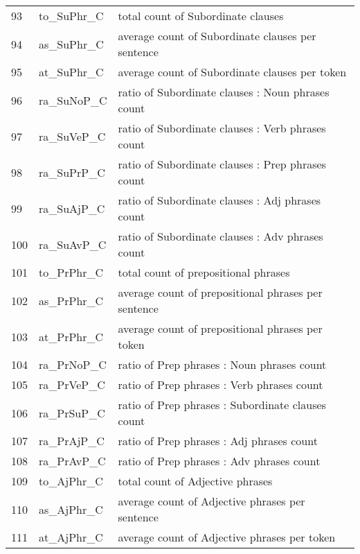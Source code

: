 \documentclass[11pt]{article}
\begin{document}
\begin{table}[H]
{\begin{tabular}{l@{\hspace{0.5ex}}|l@{\hspace{0.5ex}}|l@{\hspace{0.8ex}}}
        93     & to\_SuPhr\_C   & total count of Subordinate clauses                              \\
        94     & as\_SuPhr\_C   & average count of Subordinate clauses per sentence               \\
        95     & at\_SuPhr\_C   & average count of Subordinate clauses per token                  \\
        96     & ra\_SuNoP\_C   & ratio of Subordinate clauses : Noun phrases count        \\
        97     & ra\_SuVeP\_C   & ratio of Subordinate clauses : Verb phrases count        \\
        98     & ra\_SuPrP\_C   & ratio of Subordinate clauses : Prep phrases count        \\
        99     & ra\_SuAjP\_C   & ratio of Subordinate clauses : Adj phrases count         \\
        100    & ra\_SuAvP\_C   & ratio of Subordinate clauses : Adv phrases count         \\
        101    & to\_PrPhr\_C   & total count of prepositional phrases                            \\
        102    & as\_PrPhr\_C   & average count of prepositional phrases per sentence             \\
        103    & at\_PrPhr\_C   & average count of prepositional phrases per token                \\
        104    & ra\_PrNoP\_C   & ratio of Prep phrases : Noun phrases count               \\
        105    & ra\_PrVeP\_C   & ratio of Prep phrases : Verb phrases count               \\
        106    & ra\_PrSuP\_C   & ratio of Prep phrases : Subordinate clauses count        \\
        107    & ra\_PrAjP\_C   & ratio of Prep phrases : Adj phrases count                \\
        108    & ra\_PrAvP\_C   & ratio of Prep phrases : Adv phrases count                \\
        109    & to\_AjPhr\_C   & total count of Adjective phrases                                \\
        110    & as\_AjPhr\_C   & average count of Adjective phrases per sentence                 \\
        111    & at\_AjPhr\_C   & average count of Adjective phrases per token                    \\

\end{tabular}}
\end{table}
\end{document}
